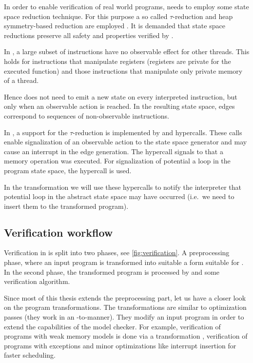 In order to enable verification of real world programs, \DIVINE needs to employ
some state space reduction technique. For this purpose a so called
$\tau$-reduction and heap symmetry-based reduction are employed \cite{Rockai13}
\cite{RockaiCB17}.  It is demanded that state space reductions preserve all
safety and \LTL properties verified by \DIVINE.

In \LLVM, a large subset of instructions have no observable effect for other
threads. This holds for instructions that manipulate registers (registers are
private for the executed function) and those instructions that manipulate only
private memory of a thread.

Hence \DIVINE does not need to emit a new state on every interpreted
instruction, but only when an observable action is reached. In the resulting
state space, edges correspond to sequences of non-observable instructions.

In \DIVM, a support for the $\tau$-reduction is implemented by
 and  hypercalls. These calls enable
signalization of an observable action to the state space generator and may cause
an interrupt in the edge generation. The  hypercall
signals to \DIVM that a memory operation was executed. For signalization of
potential a loop in the program state space, the  hypercall
is used.

In the transformation we will use these hypercalls to notify the interpreter
that potential loop in the abstract state space may have occurred (i.e.~we need
to insert them to the transformed program).

\subsection{Verification workflow}

Verification in \DIVINE is split into two phases, see
\autoref{fig:verification}.  A preprocessing phase, where an input program is
transformed into suitable a form suitable for \DIVM. In the second phase, the
transformed program is processed by \DIVM and some verification algorithm.

Since most of this thesis extends the preprocessing part, let us have a closer
look on the program transformations. The transformations are similar to \LLVM
optimization passes (they work in an \LLVM -to-\LLVM manner). They modify an
input program in order to extend the capabilities of the model checker. For
example, verification of programs with weak memory models is done via a
transformation \cite{Still16}, verification of programs with exceptions
\cite{Still17} and minor optimizations like interrupt insertion for faster
scheduling.

